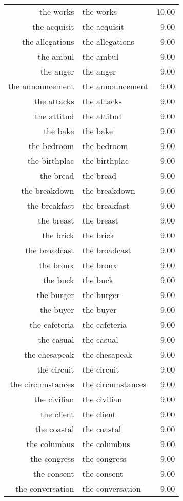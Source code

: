 \begin{table}[ht]
\begin{tabular}{rlr}
  the works & the works & 10.00 \\ 
  the acquisit & the acquisit & 9.00 \\ 
  the allegations & the allegations & 9.00 \\ 
  the ambul & the ambul & 9.00 \\ 
  the anger & the anger & 9.00 \\ 
  the announcement & the announcement & 9.00 \\ 
  the attacks & the attacks & 9.00 \\ 
  the attitud & the attitud & 9.00 \\ 
  the bake & the bake & 9.00 \\ 
  the bedroom & the bedroom & 9.00 \\ 
  the birthplac & the birthplac & 9.00 \\ 
  the bread & the bread & 9.00 \\ 
  the breakdown & the breakdown & 9.00 \\ 
  the breakfast & the breakfast & 9.00 \\ 
  the breast & the breast & 9.00 \\ 
  the brick & the brick & 9.00 \\ 
  the broadcast & the broadcast & 9.00 \\ 
  the bronx & the bronx & 9.00 \\ 
  the buck & the buck & 9.00 \\ 
  the burger & the burger & 9.00 \\ 
  the buyer & the buyer & 9.00 \\ 
  the cafeteria & the cafeteria & 9.00 \\ 
  the casual & the casual & 9.00 \\ 
  the chesapeak & the chesapeak & 9.00 \\ 
  the circuit & the circuit & 9.00 \\ 
  the circumstances & the circumstances & 9.00 \\ 
  the civilian & the civilian & 9.00 \\ 
  the client & the client & 9.00 \\ 
  the coastal & the coastal & 9.00 \\ 
  the columbus & the columbus & 9.00 \\ 
  the congress & the congress & 9.00 \\ 
  the consent & the consent & 9.00 \\ 
  the conversation & the conversation & 9.00 \\ 

\end{tabular}
\end{table}
